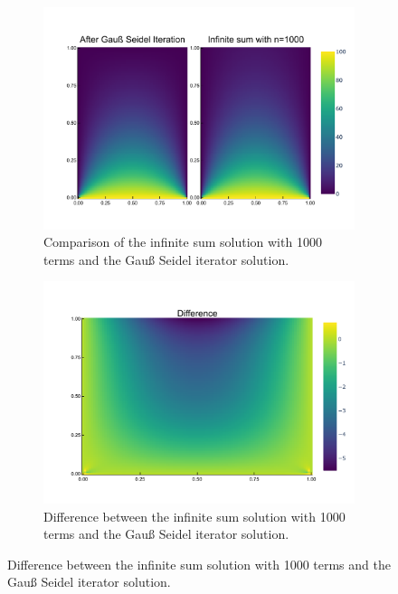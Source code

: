 \documentclass[
	a4paper, %
	10pt, %
]{CSUniSchoolLabReport}
\begin{document}
\begin{figure}[H]
	\centering
	\begin{subfigure}[b]{\textwidth}
		\includegraphics[width=\textwidth]{../saves_t1/comp_laplace_heatmap.pdf}
		\caption{Comparison of the infinite sum solution with 1000 terms and the Gauß Seidel iterator solution.}
	\end{subfigure}
	\hfill
	\centering
	\begin{subfigure}[b]{0.6\textwidth}
		\includegraphics[width=\textwidth]{../saves_t1/difference_laplace_heatmap.pdf}
		\caption{Difference between the infinite sum solution with 1000 terms and the Gauß Seidel iterator solution.}
	\end{subfigure}
\end{figure}
\end{document}
